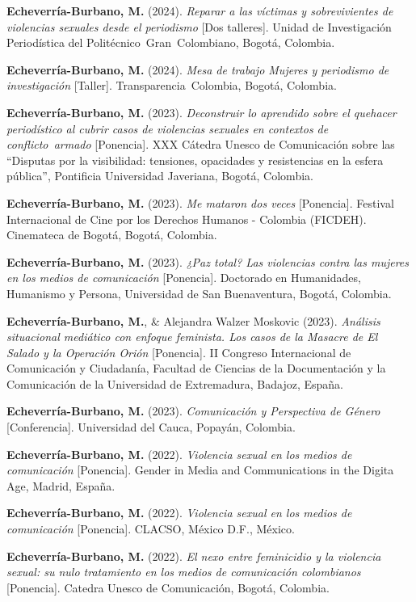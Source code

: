 \documentclass[11pt,a4paper,]{awesome-cv}
\begin{document}
\textbf{Echeverría-Burbano, M.} (2024). \emph{Reparar a las víctimas y
sobrevivientes de violencias sexuales desde el periodismo} {[}Dos
talleres{]}. Unidad de Investigación Periodística del
Politécnico~Gran~Colombiano, Bogotá, Colombia.

\textbf{Echeverría-Burbano, M.} (2024). \emph{Mesa de trabajo Mujeres y
periodismo de investigación} {[}Taller{]}. Transparencia~Colombia,
Bogotá, Colombia.

\textbf{Echeverría-Burbano, M.} (2023). \emph{Deconstruir lo aprendido
sobre el quehacer periodístico al cubrir casos de violencias sexuales en
contextos de conflicto~armado} {[}Ponencia{]}. XXX Cátedra Unesco de
Comunicación sobre las ``Disputas por la visibilidad: tensiones,
opacidades y resistencias en la esfera pública'', Pontificia Universidad
Javeriana, Bogotá, Colombia.

\textbf{Echeverría-Burbano, M.} (2023). \emph{Me mataron dos veces}
{[}Ponencia{]}. Festival Internacional de Cine por los Derechos Humanos
- Colombia (FICDEH). Cinemateca de Bogotá, Bogotá, Colombia.

\textbf{Echeverría-Burbano, M.} (2023). \emph{¿Paz total? Las violencias
contra las mujeres en los medios de comunicación} {[}Ponencia{]}.
Doctorado en Humanidades, Humanismo y Persona, Universidad de San
Buenaventura, Bogotá, Colombia.

\textbf{Echeverría-Burbano, M.}, \& Alejandra Walzer Moskovic (2023).
\emph{Análisis situacional mediático con enfoque feminista. Los casos de
la Masacre de El Salado y la Operación Orión} {[}Ponencia{]}. II
Congreso Internacional de Comunicación y Ciudadanía, Facultad de
Ciencias de la Documentación y la Comunicación de la Universidad de
Extremadura, Badajoz, España.

\textbf{Echeverría-Burbano, M.} (2023). \emph{Comunicación y Perspectiva
de Género} {[}Conferencia{]}. Universidad del Cauca, Popayán, Colombia.

\textbf{Echeverría-Burbano, M.} (2022). \emph{Violencia sexual en los
medios de comunicación} {[}Ponencia{]}. Gender in Media and
Communications in the Digita Age, Madrid, España.

\textbf{Echeverría-Burbano, M.} (2022). \emph{Violencia sexual en los
medios de comunicación} {[}Ponencia{]}. CLACSO, México D.F., México.

\textbf{Echeverría-Burbano, M.} (2022). \emph{El nexo entre feminicidio
y la violencia sexual: su nulo tratamiento en los medios de comunicación
colombianos} {[}Ponencia{]}. Catedra Unesco de Comunicación, Bogotá,
Colombia.
\end{document}
